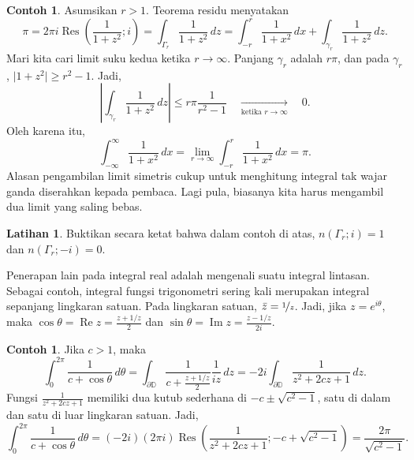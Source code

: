 \documentclass[12pt,openany]{book}
\renewcommand{\Re}{\operatorname{Re}}
\renewcommand{\Im}{\operatorname{Im}}
\newcommand{\sabs}[1]{\lvert {#1} \rvert}
\newcommand{\abs}[1]{\left\lvert {#1} \right\rvert}
\newcommand{\D}{{\mathbb{D}}}
\theoremstyle{plain}
\theoremstyle{remark}
\theoremstyle{definition}
\newenvironment{exbox}{%
    \def\FrameCommand{\vrule width 1pt \relax\hspace{10pt}}%
    \MakeFramed{\advance\hsize-\width\FrameRestore}%
}{%
    \endMakeFramed
}
\theoremstyle{exercise}
\newtheorem{exercise}{Latihan}[section]
\theoremstyle{example}
\newtheorem{example}[thm]{Contoh}
\begin{document}
\begin{example}
Asumsikan $r > 1$.
Teorema residu menyatakan
\begin{equation*}
\pi
=
2 \pi i \operatorname{Res}\left(\frac{1}{1+z^2};i\right) =
\int_{\Gamma_r} \frac{1}{1+z^2} \, dz
=
\int_{-r}^r \frac{1}{1+x^2} \, dx
+
\int_{\gamma_r} \frac{1}{1+z^2} \, dz .
\end{equation*}
Mari kita cari limit suku kedua ketika $r \to \infty$.
Panjang $\gamma_r$ adalah $r\pi$,
dan pada $\gamma_r$,
$\sabs{1+z^2} \geq r^2-1$. Jadi,
\begin{equation*}
\abs{
\int_{\gamma_r} \frac{1}{1+z^2} \, dz
}
\leq
r \pi \frac{1}{r^2-1}
\quad\underset{\text{ketika } r \to \infty}{\to}\quad 0 .
\end{equation*}
Oleh karena itu,
\begin{equation*}
\int_{-\infty}^\infty
\frac{1}{1+x^2} \, dx
=
\lim_{r\to \infty} \int_{-r}^r
\frac{1}{1+x^2} \, dx
= \pi .
\end{equation*}
Alasan pengambilan limit simetris cukup untuk menghitung integral tak wajar
ganda diserahkan kepada pembaca. Lagi pula, biasanya kita harus
mengambil dua limit yang saling bebas.
\end{example}

\begin{exbox}
\begin{exercise}
Buktikan secara ketat bahwa dalam contoh di atas,
$n(\Gamma_r;i) = 1$ dan
$n(\Gamma_r;-i) = 0$.
\end{exercise}
\end{exbox}

Penerapan lain pada integral real adalah mengenali
suatu integral lintasan. Sebagai contoh, integral fungsi trigonometri
sering kali merupakan integral sepanjang lingkaran satuan. Pada lingkaran
satuan, $\bar{z} = \nicefrac{1}{z}$. Jadi, jika $z=e^{i\theta}$, maka
$\cos \theta = \Re z = \frac{z+1/z}{2}$ dan
$\sin \theta = \Im z = \frac{z-1/z}{2i}$.

\begin{example}
Jika $c > 1$, maka
\begin{equation*}
\int_0^{2\pi} \frac{1}{c+\cos \theta} \, d\theta
=
\int_{\partial \D} \frac{1}{c+\frac{z+1/z}{2}} \frac{1}{iz} \, dz
=
-2i
\int_{\partial \D} \frac{1}{z^2 + 2cz + 1} \, dz
.
\end{equation*}
Fungsi $\frac{1}{z^2 + 2cz + 1}$ memiliki dua kutub sederhana di $-c \pm \sqrt{c^2-1}$,
satu di dalam dan satu di luar lingkaran satuan. Jadi,
\begin{equation*}
\int_0^{2\pi} \frac{1}{c+\cos \theta} \, d\theta
=
(-2i)
(2 \pi i)
\operatorname{Res}
\left(\frac{1}{z^2 + 2cz + 1}; -c+\sqrt{c^2-1}\right)
=
\frac{2\pi}{\sqrt{c^2-1}}
.
\end{equation*}
\end{example}
\end{document}
